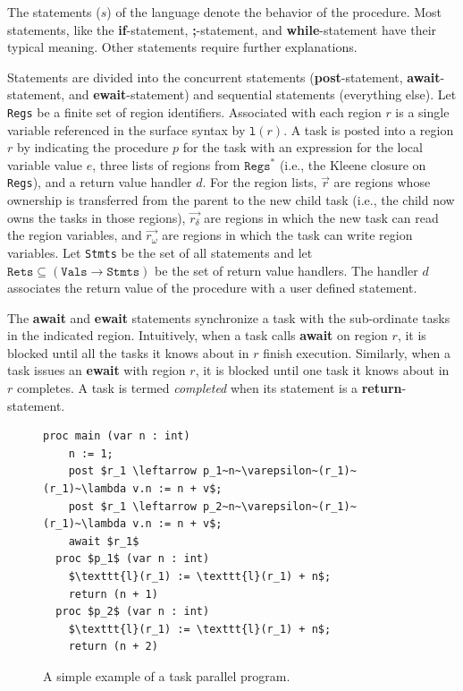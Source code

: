 The statements ($s$) of the language denote the behavior of the procedure. Most statements, like the \textbf{if}-statement, \textbf{;}-statement, and \textbf{while}-statement have their typical meaning. Other statements require further explanations.

Statements are divided into the concurrent statements (\textbf{post}-statement, \textbf{await}-statement, and \textbf{ewait}-statement) and sequential statements (everything else).  Let \texttt{Regs} be a finite set of region identifiers. Associated with each region $r$ is a single variable referenced in the surface syntax by $\texttt{l}(r)$. A task is posted into a region $r$ by indicating the procedure $p$ for the task with an expression for the local variable value $e$, three lists of regions from $\texttt{Regs}^\ast$ (i.e., the Kleene closure on \texttt{Regs}), and a return value handler $d$. For the region lists, $\vec{r}$ are regions whose ownership is transferred from the parent to the new child task (i.e., the child now owns the tasks in those regions), $\vec{r_\delta}$ are regions in which the new task can read the region variables, and $\vec{r_\omega}$ are regions in which the task can write region variables. Let \texttt{Stmts} be the set of all statements and let $\texttt{Rets} \subseteq (\texttt{Vals} \rightarrow \texttt{Stmts})$ be the set of return value handlers. The handler $d$ associates the return value of the procedure with a user defined statement. 

The \textbf{await} and \textbf{ewait} statements synchronize a task with the sub-ordinate tasks in the indicated region. Intuitively, when a task calls \textbf{await} on region $r$, it is blocked until all the tasks it knows about in $r$ finish execution. Similarly, when a task issues an \textbf{ewait} with region $r$, it is blocked until one task it knows about in $r$ completes. A task is termed \emph{completed} when its statement is a \textbf{return}-statement.  

\begin{figure}
  \begin{center}
    \begin{lstlisting}[mathescape=true]
  proc main (var n : int)
  	n := 1;
	post $r_1 \leftarrow p_1~n~\varepsilon~(r_1)~(r_1)~\lambda v.n := n + v$;
	post $r_1 \leftarrow p_2~n~\varepsilon~(r_1)~(r_1)~\lambda v.n := n + v$;
	await $r_1$
  proc $p_1$ (var n : int)
  	$\texttt{l}(r_1) := \texttt{l}(r_1) + n$;
	return (n + 1)
  proc $p_2$ (var n : int)
  	$\texttt{l}(r_1) := \texttt{l}(r_1) + n$;
	return (n + 2)
\end{lstlisting}
  \end{center}
  \caption{A simple example of a task parallel program.}
  \label{fig:hj-async-finish}
\end{figure}

